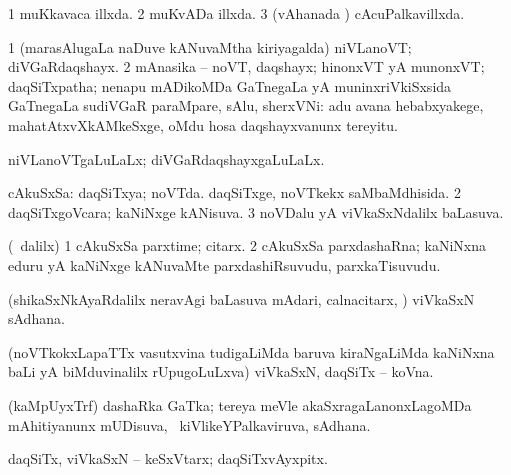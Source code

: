 {{{{{{{{{{{\bentry
{} 
\gl{\gu}
\expl{}
\bmng
\bnum
\num{1} muKkavaca illxda. 
\num{2} muKvADa illxda. 
\num{3} (vAhanada \vi) cAcuPalkavillxda. 
\enum
\emng
\eentry

\bentry 
{} 
\gl{\nA}
\expl{}
\bmng
\bnum
\num{1} (marasAlugaLa naDuve kANuvaMtha kiriyagalda) niVLanoVT; diVGaRdaqshayx. 
\num{2} mAnasika -- noVT, daqshayx; hinonxVT yA munonxVT; daqSiTxpatha; nenapu mADikoMDa GaTnegaLa yA muninxriVkiSxsida GaTnegaLa sudiVGaR paraMpare, sAlu, sherxVNi:  adu avana hebabxyakege, mahatAtxvXkAMkeSxge, oMdu hosa daqshayxvanunx tereyitu. 
\enum
\emng
\eentry

\bentry 
{} 
\gl{\gu}
\expl{}
\bmng
 niVLanoVTgaLuLaLx; diVGaRdaqshayxgaLuLaLx. 
\emng
\eentry

\bentry 
{} 
\gl{\gu}
\expl{}
\bmng
\bnum
{} cAkuSxSa: 
\banum
{} daqSiTxya; noVTda. 
 daqSiTxge, noVTkekx saMbaMdhisida. 
\eanum
\numie
\num{2} daqSiTxgoVcara; kaNiNxge kANisuva. 
\num{3} noVDalu yA viVkaSxNdalilx baLasuva. 
\enum
\emng
\eentry

\bentry 
{} 
\gl{\nA}
\expl{}
\bmng
 (\sA\ \bava dalilx) 
\bnum
\num{1} cAkuSxSa parxtime; citarx. 
\num{2} cAkuSxSa parxdashaRna; kaNiNxna eduru yA kaNiNxge kANuvaMte parxdashiRsuvudu, parxkaTisuvudu. 
\enum
\emng
\eentry

\bentry
{}
\gl{\nA}
\expl{}
\bmng
 (shikaSxNkAyaRdalilx neravAgi baLasuva mAdari, calnacitarx, \mo) viVkaSxN sAdhana. 
\emng
\eentry

\bentry 
{} 
\gl{\nA}
\expl{}
\bmng
 (noVTkokxLapaTTx vasutxvina tudigaLiMda baruva kiraNgaLiMda kaNiNxna baLi yA biMduvinalilx rUpugoLuLxva) viVkaSxN, daqSiTx -- koVna. 
\emng
\eentry

\bentry 
{} 
\gl{\nA}
\expl{}
\bmng
 (kaMpUyxTrf) dashaRka GaTka; tereya meVle akaSxragaLanonxLagoMDa mAhitiyanunx mUDisuva, \sA\ kiVlikeYPalkaviruva, sAdhana. 
\emng
\eentry

\bentry
{} 
\gl{\nA}
\expl{}
\bmng
 daqSiTx, viVkaSxN -- keSxVtarx; daqSiTxvAyxpitx. 
\emng
\eentry

\bentry 
{} 
\gl{\nA}
\expl{}
\bmng
\emng
\eentry

}}}}}}}}}}}

